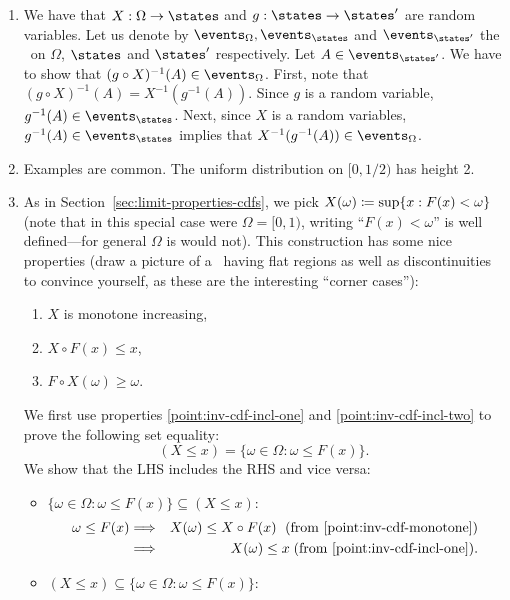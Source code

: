 \documentclass{article}
\begin{document}
\begin{enumerate}
\begin{enumerate}
  \end{enumerate}
  \item We have that $X: \Omega \to \states$ and $g : \states \to \states'$ are random variables. Let us denote by $\events_\Omega, \events_{\states}$ and $\events_{\states'}$ the \sigmaalg\ on $\Omega$, $\states$ and $\states'$ respectively. Let $A \in \events_{\states'}$. We have to show that $(g \circ X)^{-1}(A) \in \events_\Omega$. First, note that $(g \circ X)^{-1}(A) = X^{-1}(g^{-1}(A))$. Since $g$ is a random variable, $g^{-1}(A) \in \events_\states$. Next, since $X$ is a random variables, $g^{-1}(A) \in \events_\states$ implies that $X^{-1}(g^{-1}(A)) \in \events_\Omega$.
  \item Examples are common. The uniform distribution on $[0, 1/2)$ has height 2.
   \item As in Section~\ref{sec:limit-properties-cdfs}, we pick $X(\omega) \coloneqq \sup\{x : F(x) < \omega\}$ (note that in this special case were $\Omega = [0, 1)$,  writing ``$F(x) < \omega$'' is well defined---for general $\Omega$ is would not).
	This construction has some nice properties (draw a picture of a \CDF\ having flat regions as well as discontinuities to convince yourself, as these are the interesting ``corner cases''):
	\begin{enumerate}
	  \item \label{point:inv-cdf-monotone} $X$ is monotone increasing,
	  \item \label{point:inv-cdf-incl-one} $X\circ F(x) \le x$,
	  \item \label{point:inv-cdf-incl-two}$F\circ X(\omega) \ge \omega$.
	\end{enumerate}
	We first use properties \ref{point:inv-cdf-incl-one} and \ref{point:inv-cdf-incl-two} to prove the following set equality:
	\[ (X \le x) = \{\omega \in \Omega : \omega \le F(x) \}.\]
	We show that the LHS includes the RHS and vice versa:
	\begin{itemize}
	  \item $\{\omega \in \Omega : \omega \le F(x) \} \subseteq (X \le x)$:
	\begin{eqnarray*}
	\omega \le F(x) &\Longrightarrow& X(\omega)  \le X\circ F(x)\;\text{ (from \ref{point:inv-cdf-monotone})} \\
	&\Longrightarrow& X(\omega) \le x\;\text{(from \ref{point:inv-cdf-incl-one}).}
	\end{eqnarray*}
	  \item $(X \le x) \subseteq \{\omega \in \Omega : \omega \le F(x) \}$:
	\begin{eqnarray*}

\end{eqnarray*}
\end{itemize}
\end{enumerate}
\end{document}
